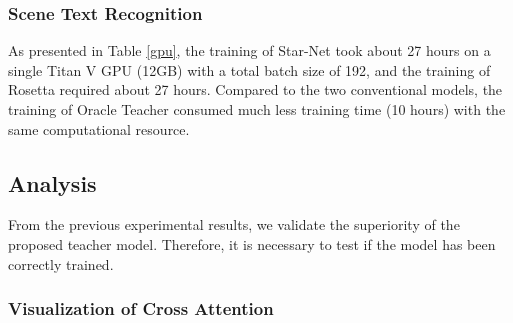 \documentclass[journal]{IEEEtran}
\begin{document}
\subsubsection{Scene Text Recognition}
As presented in Table \ref{gpu}, the training of Star-Net \cite{starnet:scheme} took about 27 hours on a single Titan V GPU (12GB) with a total batch size of 192, and the training of Rosetta \cite{rosetta:scheme} required about 27 hours.
Compared to the two conventional models, the training of Oracle Teacher consumed much less training time (10 hours) with the same computational resource.


\subsection{Analysis}
From the previous experimental results, we validate the superiority of the proposed teacher model.
Therefore, it is necessary to test if the model has been correctly trained.
\subsubsection{Visualization of Cross Attention}
\label{visual_cross}
\end{document}

